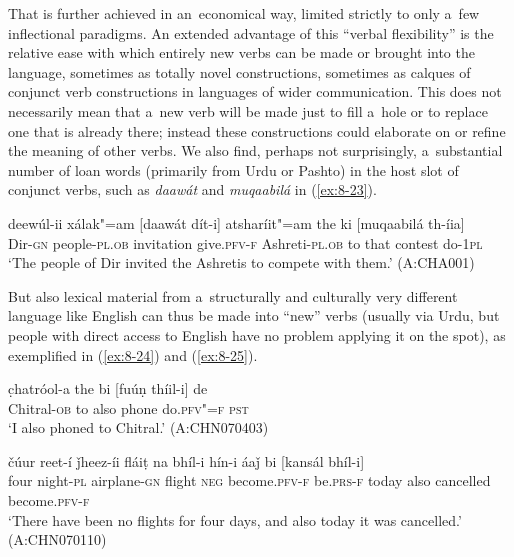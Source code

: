That is further achieved in an~economical way, limited strictly to only a~few inflectional paradigms. An extended advantage of this ``verbal flexibility'' is the relative ease with which entirely new verbs can be made or brought into the language, sometimes as totally novel constructions, sometimes as calques of conjunct verb constructions in languages of wider communication. This does not necessarily mean that a~new verb will be made just to fill a~hole or to replace one that is already there; instead these constructions could elaborate on or refine the meaning of other verbs. We also find, perhaps not surprisingly, a~substantial number of loan words (primarily from Urdu or Pashto) in the host slot of conjunct verbs, such as \textit{daawát} and \textit{muqaabilá} in (\ref{ex:8-23}).

\begin{exe}
\ex
\label{ex:8-23}
\gll deewúl-ii xálak"=am [daawát dít-i] atsharíit"=am the ki [muqaabilá th-íia] \\
Dir-\textsc{gn} people-\textsc{pl.ob} invitation give.\textsc{pfv-f} Ashreti-\textsc{pl.ob} to that contest do-\textsc{1pl} \\
\glt `The people of Dir invited the Ashretis to compete with them.' (A:CHA001)
\end{exe}

But also lexical material from a~structurally and culturally very different language like English can thus be made into ``new'' verbs (usually via Urdu, but people with direct access to English have no problem applying it on the spot), as exemplified in (\ref{ex:8-24}) and (\ref{ex:8-25}).

\begin{exe}
\ex
\label{ex:8-24}
\gll c̣hatróol-a the bi [fuúṇ thíil-i] de \\
Chitral-\textsc{ob} to also phone do.\textsc{pfv"=f} \textsc{pst} \\
\glt `I also phoned to Chitral.' (A:CHN070403)
\end{exe}
\begin{exe}
\ex
\label{ex:8-25}
\gll čúur reet-í ǰheez-íi fláiṭ na bhíl-i  hín-i áaǰ bi [kansál
  bhíl-i]  \\
four night-\textsc{pl} airplane-\textsc{gn} flight \textsc{neg} become.\textsc{pfv-f}  be.\textsc{prs-f} today also cancelled become.\textsc{pfv-f}  \\
\glt `There have been no flights for four days, and also today it was cancelled.' (A:CHN070110)
\end{exe}

